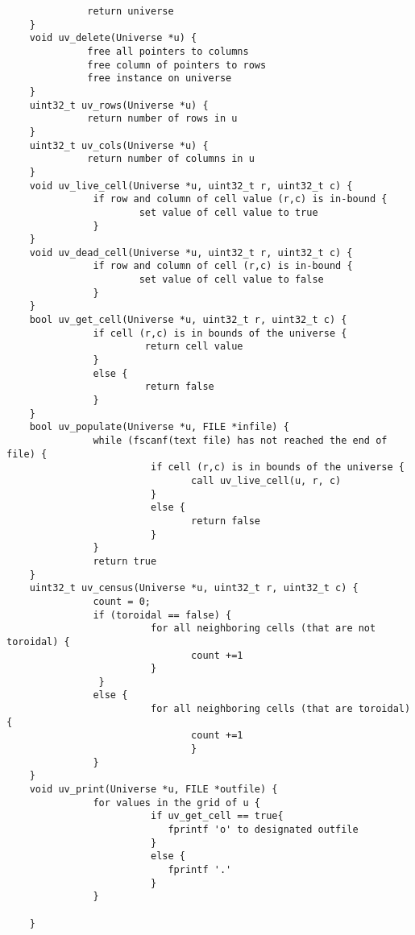 \documentclass[11pt]{article}
\begin{document}
\begin{verbatim}
              return universe
    }
    void uv_delete(Universe *u) {
              free all pointers to columns
              free column of pointers to rows              
              free instance on universe
    }
    uint32_t uv_rows(Universe *u) {
              return number of rows in u
    }
    uint32_t uv_cols(Universe *u) {
              return number of columns in u
    }
    void uv_live_cell(Universe *u, uint32_t r, uint32_t c) {
               if row and column of cell value (r,c) is in-bound {
                       set value of cell value to true
               }
    }
    void uv_dead_cell(Universe *u, uint32_t r, uint32_t c) {
               if row and column of cell (r,c) is in-bound {
                       set value of cell value to false
               }
    }
    bool uv_get_cell(Universe *u, uint32_t r, uint32_t c) { 
               if cell (r,c) is in bounds of the universe {
                        return cell value
               }
               else {
                        return false
               }
    }
    bool uv_populate(Universe *u, FILE *infile) {
               while (fscanf(text file) has not reached the end of file) {
                         if cell (r,c) is in bounds of the universe {
                                call uv_live_cell(u, r, c)
                         }
                         else {
                                return false
                         }
               }
               return true
    }
    uint32_t uv_census(Universe *u, uint32_t r, uint32_t c) {
               count = 0;
               if (toroidal == false) {
                         for all neighboring cells (that are not toroidal) {
                                count +=1
                         }
                }
               else {
                         for all neighboring cells (that are toroidal) {
                                count +=1
                                }
               }
    }
    void uv_print(Universe *u, FILE *outfile) {
               for values in the grid of u {
                         if uv_get_cell == true{
                            fprintf 'o' to designated outfile
                         }
                         else {
                            fprintf '.'
                         }
               }
    
    }
\end{verbatim}
\end{document}
